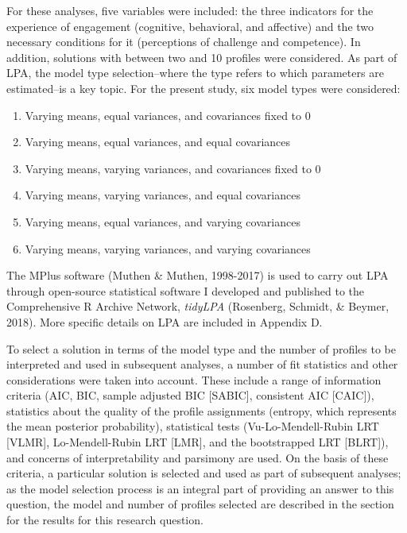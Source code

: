 \documentclass[]{book}
\providecommand{\tightlist}{%
  \setlength{\itemsep}{0pt}\setlength{\parskip}{0pt}}
\theoremstyle{definition}
\theoremstyle{definition}
\theoremstyle{definition}
\theoremstyle{remark}
\begin{document}
For these analyses, five variables were included: the three indicators
for the experience of engagement (cognitive, behavioral, and affective)
and the two necessary conditions for it (perceptions of challenge and
competence). In addition, solutions with between two and 10 profiles
were considered. As part of LPA, the model type selection--where the
type refers to which parameters are estimated--is a key topic. For the
present study, six model types were considered:

\begin{enumerate}
\def\labelenumi{\arabic{enumi}.}
\tightlist
\item
  Varying means, equal variances, and covariances fixed to 0
\item
  Varying means, equal variances, and equal covariances
\item
  Varying means, varying variances, and covariances fixed to 0
\item
  Varying means, varying variances, and equal covariances
\item
  Varying means, equal variances, and varying covariances
\item
  Varying means, varying variances, and varying covariances
\end{enumerate}

The MPlus software (Muthen \& Muthen, 1998-2017) is used to carry out
LPA through open-source statistical software I developed and published
to the Comprehensive R Archive Network, \emph{tidyLPA} (Rosenberg,
Schmidt, \& Beymer, 2018). More specific details on LPA are included in
Appendix D.

To select a solution in terms of the model type and the number of
profiles to be interpreted and used in subsequent analyses, a number of
fit statistics and other considerations were taken into account. These
include a range of information criteria (AIC, BIC, sample adjusted BIC
{[}SABIC{]}, consistent AIC {[}CAIC{]}), statistics about the quality of
the profile assignments (entropy, which represents the mean posterior
probability), statistical tests (Vu-Lo-Mendell-Rubin LRT {[}VLMR{]},
Lo-Mendell-Rubin LRT {[}LMR{]}, and the bootstrapped LRT {[}BLRT{]}),
and concerns of interpretability and parsimony are used. On the basis of
these criteria, a particular solution is selected and used as part of
subsequent analyses; as the model selection process is an integral part
of providing an answer to this question, the model and number of
profiles selected are described in the section for the results for this
research question.
\end{document}
